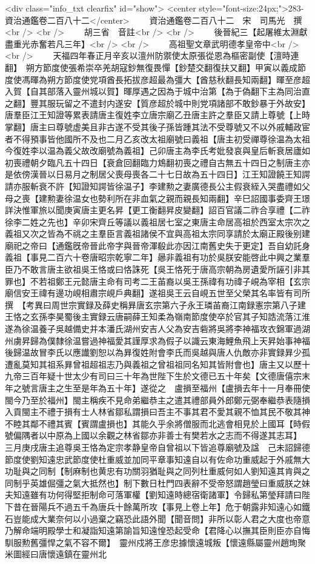 <div class="info_txt clearfix" id="show">
<center style="font-size:24px;">283-資治通鑑卷二百八十二</center>
  　　資治通鑑卷二百八十二　宋　司馬光　撰<br />
<br />
　　胡三省　音註<br />
<br />
　　後晉紀三【起屠維太淵獻盡重光赤奮若凡三年】<br />
<br />
　　高祖聖文章武明德孝皇帝中<br />
<br />
　　天福四年春正月辛亥以澶州防禦使太原張從恩為樞密副使【澶時連翻】　朔方節度使張希崇卒羌胡寇鈔無復畏憚【鈔楚交翻復扶又翻】甲寅以義成節度使馮暉為朔方節度使党項酋長拓拔彦超最為彊大【酋慈秋翻長知兩翻】暉至彦超入賀【自其部落入靈州城以賀】暉厚遇之因為于城中治第【為于偽翻下主為同治直之翻】豐其服玩留之不遣封内遂安【質彦超於城中則党項諸部不敢鈔暴于外故安】　唐羣臣江王知證等累表請唐主復姓李立唐宗廟乙丑唐主許之羣臣又請上尊號【上時掌翻】唐主曰尊號虚美且非古遂不受其後子孫皆踵其法不受尊號又不以外戚輔政宦者不得預事皆他國所不及也二月乙亥改太祖廟號曰義祖【唐主初受禪尊徐温為太祖今復姓李以温為義父故改廟號為義祖】己卯唐主為李氏考妣發哀與皇后斬衰居廬如初喪禮朝夕臨凡五十四日【衰倉回翻臨力鴆翻初喪之禮自古無五十四日之制唐主亦是依傍漢晉以日易月之制居父喪母喪各二十七日故為五十四日】江王知證饒王知諤請亦服斬衰不許【知證知諤皆徐温子】李建勲之妻廣德長公主假衰絰入哭盡禮如父母之喪【建勲妻徐温女也勢利所在非血氣之親而親長知兩翻】辛巳詔國事委齊王璟詳決惟軍旅以聞庚寅唐主更名昇【更工衡翻昇皮變翻】詔百官議二祚合享禮【二祚徐李二姓之先也】辛卯宋齊丘等議以義祖居七室之東唐主命居高祖於西室太宗次之義祖又次之皆為不祧之主羣臣言義祖諸侯不宜與高祖太宗同享請於太廟正殿後别建廟祀之帝曰【通鑑旣帝晉此帝字與晉帝渾殽此亦因江南舊史失于更定】吾自幼託身義祖【事見二百六十卷唐昭宗乾寧二年】曏非義祖有功於吳朕安能啓此中興之業羣臣乃不敢言唐主欲祖吳王恪或曰恪誅死【吳王恪死于唐高宗朝為房遺愛所誣引非其罪也】不若祖鄭王元懿唐主命有司考二王苖裔以吳王孫禕有功禕子峴為宰相【玄宗廟信安王禕有邊功峴相肅宗峴戶典翻】遂祖吳王云自峴五世至父榮其名率皆有司所撰　【考異曰周世宗實録及薛史稱昪唐玄宗第六子永王璘苖裔江南録憲宗第八子建王恪之玄孫李昊蜀後主實録云唐嗣薛王知柔為嶺南節度使卒於官其子知誥流落江淮遂為徐温養子吳越備史并本潘氏湖州安吉人父為安吉砦將吳將李神福攻衣錦軍過湖州虜昇歸為僕隸徐温嘗過神福愛其謹厚求為假子以識云東海鯉魚飛上天昇始事神福後歸温故冒李氏以應䜟劉恕以為昪復姓附會李氏而吳越與唐人仇敵亦非實録昪少孤遭亂莫知其祖系昪曾祖超祖志乃與義祖之曾祖祖同名知其皆附會也】唐主又以歷十九帝三百年疑十世太少有司曰三十年為世陛下生於文德已五十年矣【文德唐僖宗末年之號言唐主之生至是年為五十年】遂從之　盧損至福州【盧損去年十一月奉冊使閩今乃至於福州】閩主稱疾不見命弟繼恭主之遣其禮部員外郎鄭元弼奉繼恭表隨損入貢閩主不禮于損有士人林省鄒私謂損曰吾主不事其君不愛其親不恤其民不敬其神不睦其鄰不禮其賓【賓謂盧損也】其能久乎余將僧服而北逃會相見於上國耳【時假號偏隅者以中原為上國以余觀之林省鄒亦非善士有樊若水之志而不得遂其志耳】　三月庚戌唐主追尊吳王恪為定宗孝静皇帝自曾祖以下皆追尊廟號及諡　己未詔歸德節度使劉知遠忠武節度使杜重威並加同平章事知遠自以有佐命功重威起于外戚無大功耻與之同制【制麻制也黄忠有功關羽猶耻與之同列杜重威何如人劉知遠其肯與之同制乎英雄倔彊之氣大抵然也】制下數日杜門四表辭不受帝怒謂趙瑩曰重威朕之妹夫知遠雖有功何得堅拒制命可落軍權【劉知遠時總宿衛諸軍】令歸私第瑩拜請曰陛下昔在晉陽兵不過五千為唐兵十餘萬所攻【事見上卷上年】危于朝露非知遠心如鐵石豈能成大業奈何以小過棄之竊恐此語外聞【聞音問】非所以彰人君之大度也帝意乃解命端明殿學士和凝詣知遠第諭旨知遠惶恐起受命【君降心以撫其臣則臣亦自悔馴服勲舊彊悍之氣不容不爾】　靈州戍將王彦忠據懷遠城叛【懷遠縣屬靈州趙珣聚米圖經曰唐懷遠鎮在靈州北